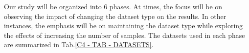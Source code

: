 Our study will be organized into 6 phases. At times, the focus will be on observing the impact of changing the dataset type on the results. In other instances, the emphasis will be on maintaining the dataset type while exploring the effects of increasing the number of samples. The datasets used in each phase are summarized in Tab.\ref{C4 - TAB - DATASETS}.






















